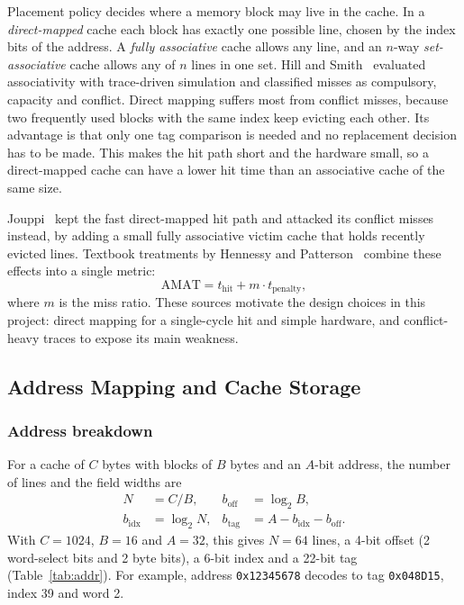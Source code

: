 Placement policy decides where a memory block may live in the cache. In a
\emph{direct-mapped} cache each block has exactly one possible line, chosen
by the index bits of the address. A \emph{fully associative} cache allows any
line, and an $n$-way \emph{set-associative} cache allows any of $n$ lines in
one set. Hill and Smith~\cite{hill1989} evaluated associativity with
trace-driven simulation and classified misses as compulsory, capacity and
conflict. Direct mapping suffers most from conflict misses, because two
frequently used blocks with the same index keep evicting each other. Its
advantage is that only one tag comparison is needed and no replacement
decision has to be made. This makes the hit path short and the hardware
small, so a direct-mapped cache can have a lower hit time than an associative
cache of the same size.

Jouppi~\cite{jouppi1990} kept the fast direct-mapped hit path and attacked
its conflict misses instead, by adding a small fully associative victim
cache that holds recently evicted lines. Textbook treatments by Hennessy and
Patterson~\cite{hennessy2017,patterson2020} combine these effects into a
single metric:
\begin{equation}
\mathrm{AMAT} = t_{\mathrm{hit}} + m \cdot t_{\mathrm{penalty}},
\end{equation}
where $m$ is the miss ratio. These sources motivate the design choices in
this project: direct mapping for a single-cycle hit and simple hardware, and
conflict-heavy traces to expose its main weakness.


\subsection{Address Mapping and Cache Storage}

\subsubsection{Address breakdown}
For a cache of $C$ bytes with blocks of $B$ bytes and an $A$-bit address, the
number of lines and the field widths are
\begin{align}
N &= C/B, & b_{\mathrm{off}} &= \log_2 B,\\
b_{\mathrm{idx}} &= \log_2 N, & b_{\mathrm{tag}} &= A - b_{\mathrm{idx}} - b_{\mathrm{off}}.
\end{align}
With $C = 1024$, $B = 16$ and $A = 32$, this gives $N = 64$ lines, a 4-bit
offset (2 word-select bits and 2 byte bits), a 6-bit index and a 22-bit tag
(Table~\ref{tab:addr}). For example, address \texttt{0x12345678} decodes to
tag \texttt{0x048D15}, index 39 and word 2.


